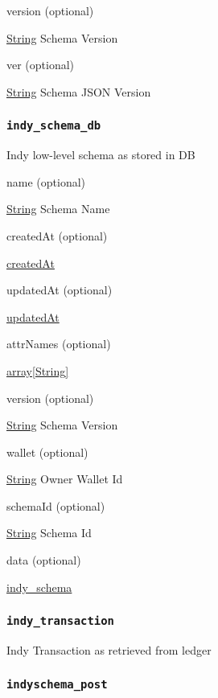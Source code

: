 version (optional)

{\protect\hyperlink{string}{String}} Schema Version

ver (optional)

{\protect\hyperlink{string}{String}} Schema JSON Version

\hypertarget{indy_schema_db}{%
\subsubsection{\texorpdfstring{\protect\hypertarget{indy_schema_db}{}{\texttt{indy\_schema\_db}}}{indy\_schema\_db}}\label{indy_schema_db}}

Indy low-level schema as stored in DB

name (optional)

{\protect\hyperlink{string}{String}} Schema Name

createdAt (optional)

{\protect\hyperlink{createdAt}{createdAt}}

updatedAt (optional)

{\protect\hyperlink{updatedAt}{updatedAt}}

attrNames (optional)

{\protect\hyperlink{string}{array{[}String{]}}}

version (optional)

{\protect\hyperlink{string}{String}} Schema Version

wallet (optional)

{\protect\hyperlink{string}{String}} Owner Wallet Id

schemaId (optional)

{\protect\hyperlink{string}{String}} Schema Id

data (optional)

{\protect\hyperlink{indy_schema}{indy\_schema}}

\hypertarget{indy_transaction}{%
\subsubsection{\texorpdfstring{\protect\hypertarget{indy_transaction}{}{\texttt{indy\_transaction}}}{indy\_transaction}}\label{indy_transaction}}

Indy Transaction as retrieved from ledger

\hypertarget{indyschema_post}{%
\subsubsection{\texorpdfstring{\protect\hypertarget{indyschema_post}{}{\texttt{indyschema\_post}}}{indyschema\_post}}\label{indyschema_post}}

